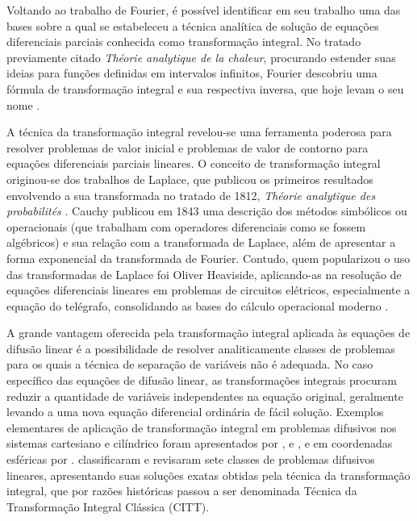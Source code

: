 Voltando ao trabalho de Fourier, é possível identificar em seu trabalho uma das bases sobre a qual se estabeleceu a técnica analítica de solução
de equações diferenciais parciais conhecida como transformação integral. No tratado previamente citado \textit{Théorie analytique de la chaleur},
procurando estender suas ideias para funções definidas em intervalos infinitos, Fourier descobriu uma fórmula de transformação integral e
sua respectiva inversa, que hoje levam o seu nome \citep{livro_integral_transforms}.

A técnica da transformação integral revelou-se uma
ferramenta poderosa para resolver problemas de valor inicial e problemas de valor de contorno para equações diferenciais parciais lineares.
O conceito de transformação integral originou-se dos trabalhos de Laplace, que publicou os primeiros resultados envolvendo a sua transformada
no tratado de 1812, \textit{Théorie analytique des probabilités} \citep{livro_integral_transforms}. Cauchy publicou em 1843 uma descrição
dos métodos simbólicos ou operacionais (que trabalham com operadores diferenciais como se fossem algébricos) \citep{livro_cauchy} e sua relação com a transformada de
Laplace, além de apresentar a forma exponencial da transformada de Fourier. Contudo, quem popularizou o uso das transformadas de Laplace foi Oliver Heaviside,
aplicando-as na resolução de equações diferenciais lineares em problemas de circuitos elétricos, especialmente a equação do telégrafo, consolidando as bases do
cálculo operacional moderno \citep{livro_yavetz, artigo_carson}. 

A grande vantagem oferecida pela transformação integral aplicada às equações de difusão linear é a possibilidade de resolver analiticamente classes de
problemas para os quais a técnica de separação de variáveis não é adequada.
No caso específico das equações de difusão linear, as transformações integrais procuram reduzir a quantidade de variáveis independentes
na equação original, geralmente levando a uma nova equação diferencial ordinária de fácil solução. Exemplos elementares de aplicação
de transformação integral em problemas difusivos nos sistemas cartesiano e cilíndrico foram apresentados por \cite{artigo_doetsch}, \cite{artigo_sneddon} e \cite{livro_tranter},
e em coordenadas esféricas por \cite{artigo_olcer}.
\cite{livro_unified} classificaram e revisaram sete classes de problemas difusivos lineares, apresentando suas soluções
exatas obtidas pela técnica da transformação integral, que por razões históricas passou a ser denominada Técnica da Transformação Integral Clássica (CITT).

